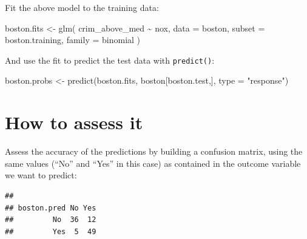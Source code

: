 \documentclass[
]{book}
\newenvironment{Shaded}{\begin{snugshade}}{\end{snugshade}}
\newcommand{\AttributeTok}[1]{\textcolor[rgb]{0.77,0.63,0.00}{#1}}
\newcommand{\FloatTok}[1]{\textcolor[rgb]{0.00,0.00,0.81}{#1}}
\newcommand{\FunctionTok}[1]{\textcolor[rgb]{0.00,0.00,0.00}{#1}}
\newcommand{\NormalTok}[1]{#1}
\newcommand{\OtherTok}[1]{\textcolor[rgb]{0.56,0.35,0.01}{#1}}
\newcommand{\SpecialCharTok}[1]{\textcolor[rgb]{0.00,0.00,0.00}{#1}}
\newcommand{\StringTok}[1]{\textcolor[rgb]{0.31,0.60,0.02}{#1}}
\begin{document}
Fit the above model to the training data:

\begin{Shaded}
\begin{Highlighting}[]
\NormalTok{boston.fits }\OtherTok{\textless{}{-}}
  \FunctionTok{glm}\NormalTok{(}
\NormalTok{    crim\_above\_med }\SpecialCharTok{\textasciitilde{}}\NormalTok{ nox,}
    \AttributeTok{data =}\NormalTok{ boston,}
    \AttributeTok{subset =}\NormalTok{ boston.training,}
    \AttributeTok{family =}\NormalTok{ binomial}
\NormalTok{  )}
\end{Highlighting}
\end{Shaded}

And use the fit to predict the test data with \texttt{predict()}:

\begin{Shaded}
\begin{Highlighting}[]
\NormalTok{boston.probs }\OtherTok{\textless{}{-}} \FunctionTok{predict}\NormalTok{(boston.fits, boston[boston.test,], }\AttributeTok{type =} \StringTok{"response"}\NormalTok{)}
\end{Highlighting}
\end{Shaded}

\hypertarget{how-to-assess-it-2}{%
\section{How to assess it}\label{how-to-assess-it-2}}

Assess the accuracy of the predictions by building a confusion matrix, using the same values (``No'' and ``Yes'' in this case) as contained in the outcome variable we want to predict:

\begin{Shaded}
\end{Shaded}

\begin{verbatim}
##            
## boston.pred No Yes
##         No  36  12
##         Yes  5  49
\end{verbatim}
\end{document}
